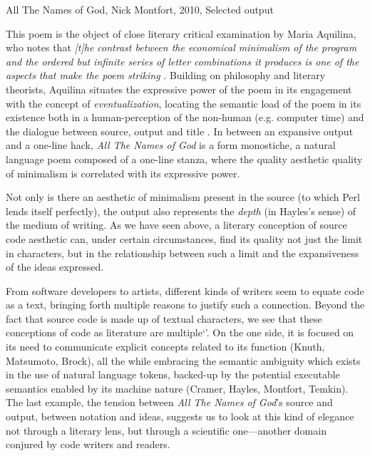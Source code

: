 \begin{listing}
  \inputminted{text}{./corpus/all_the_names_of_god.txt}
  \caption{All The Names of God, Nick Montfort, 2010, Selected output}
  \label{code:all_the_outputs_of_god}
\end{listing}

This poem is the object of close literary critical examination by Maria Aquilina, who notes that \emph{[t]he contrast between the economical minimalism of the program and the ordered but infinite series of letter combinations it produces is one of the aspects that make the poem striking} \citep{aquilina_computational_2015}. Building on philosophy and literary theorists, Aquilina situates the expressive power of the poem in its engagement with the concept of \emph{eventualization}, locating the semantic load of the poem in its existence both in a human-perception of the non-human (e.g. computer time) and the dialogue between source, output and title \citep{aquilina_computational_2015}. In between an expansive output and a one-line hack, \emph{All The Names of God} is a form monostiche, a natural language poem composed of a one-line stanza, where the quality aesthetic quality of minimalism is correlated with its expressive power.

Not only is there an aesthetic of minimalism present in the source (to which Perl lends itself perfectly), the output also represents the \emph{depth} (in Hayles's sense) of the medium of writing. As we have seen above, a literary conception of source code aesthetic can, under certain circumstances, find its quality not just the limit in characters, but in the relationship between such a limit and the expansiveness of the ideas expressed.

From software developers to artists, different kinds of writers seem to equate code as a text, bringing forth multiple reasons to justify such a connection. Beyond the fact that source code is made up of textual characters, we see that these conceptions of code as literature are multiple`'. On the one side, it is focused on its need to communicate explicit concepts related to its function (Knuth, Matsumoto, Brock), all the while embracing the semantic ambiguity which exists in the use of natural language tokens, backed-up by the potential executable semantics enabled by its machine nature (Cramer, Hayles, Montfort, Temkin).
The last example, the tension between \emph{All The Names of God}'s source and output, between notation and ideas, suggests us to look at this kind of elegance not through a literary lens, but through a scientific one—another domain conjured by code writers and readers.


